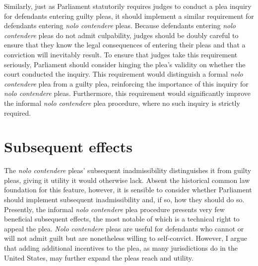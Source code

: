 Similarly, just as Parliament statutorily requires judges to conduct a plea inquiry for defendants entering guilty pleas, it should implement a similar requirement for defendants entering \textit{nolo contendere} pleas. Because defendants entering \textit{nolo contendere} pleas do not admit culpability, judges should be doubly careful to ensure that they know the legal consequences of entering their pleas and that a conviction will inevitably result. To ensure that judges take this requirement seriously, Parliament should consider hinging the plea's validity on whether the court conducted the inquiry. This requirement would distinguish a formal \textit{nolo contendere} plea from a guilty plea, reinforcing the importance of this inquiry for \textit{nolo contendere} pleas. Furthermore, this requirement would significantly improve the informal \textit{nolo contendere} plea procedure, where no such inquiry is strictly required.

\section{Subsequent effects}

The \textit{nolo contendere} pleas' subsequent inadmissibility distinguishes it from guilty pleas, giving it utility it would otherwise lack. Absent the historical common law foundation for this feature, however, it is sensible to consider whether Parliament should implement subsequent inadmissibility and, if so, how they should do so. Presently, the informal \textit{nolo contendere} plea procedure presents very few beneficial subsequent effects, the most notable of which is a technical right to appeal the plea. \textit{Nolo contendere} pleas are useful for defendants who cannot or will not admit guilt but are nonetheless willing to self-convict. However, I argue that adding additional incentives to the plea, as many jurisdictions do in the United States, may further expand the pleas reach and utility. 

